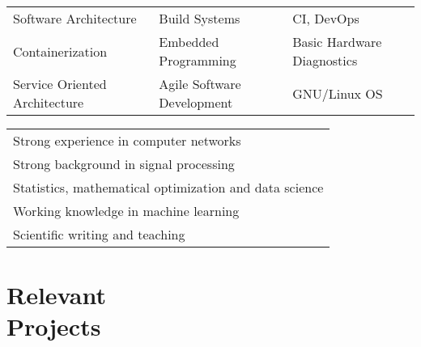 \begin{resume}
\footnotesize
\begin{tabular}{lll}
Software Architecture & Build Systems & CI, DevOps \\
Containerization & Embedded Programming & Basic Hardware Diagnostics \\
Service Oriented Architecture & Agile Software Development & GNU/Linux OS \\
\end{tabular}
\normalsize

\footnotesize
\begin{tabular}{l}
Strong experience in computer networks\\
Strong background in signal processing \\
Statistics, mathematical optimization and data science \\
Working knowledge in machine learning \\
Scientific writing and teaching \\
\end{tabular}
\normalsize
\section{Relevant \\Projects}





%
%
%
%
%
%


\end{resume}
